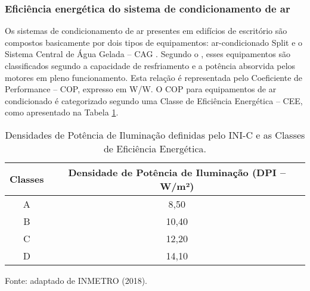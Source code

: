 \subsubsection{Eficiência energética do sistema de condicionamento de ar}
Os sistemas de condicionamento de ar presentes em edifícios de escritório são 
compostos basicamente por dois tipos de equipamentos: ar-condicionado Split e o 
Sistema Central de Água Gelada – CAG \cite{ConselhoBrasileirodeConstrucaoSustentavel-CBCS2015}.\vspace*{0.3cm} \newline
Segundo o \textcite{InstitutoNacionaldeMetrologiaNormalizacaoeQualidadeIndustrial-INMETRO2018}, esses equipamentos são classificados segundo a 
capacidade de resfriamento e a potência absorvida pelos motores em pleno 
funcionamento. Esta relação é representada pelo Coeficiente de Performance – COP, 
expresso em W/W. O COP para equipamentos de ar condicionado é categorizado 
segundo uma Classe de Eficiência Energética – CEE, como apresentado na Tabela \ref{tab:tabela6}.\vspace*{0.3cm} \newline
\begin{table}[ht]\centering
    \caption{\small Densidades de Potência de Iluminação definidas pelo INI-C e as Classes de Eficiência Energética.}
    \vspace*{0.3cm}
    \label{tab:tabela6}
    \begin{tabular*}{\columnwidth}{@{\extracolsep{\fill}}cc}
        \hline
        \textbf{Classes}                & \textbf{Densidade de Potência de Iluminação (DPI – W/m²)}\\ \hline
        A                               & 8,50                                                     \\ \hline
        B                               & 10,40                                                    \\ \hline
        C                               & 12,20                                                    \\ \hline
        D                               & 14,10                                                    \\ \hline
    \end{tabular*}
    \begin{flushleft}
        \par \small Fonte: adaptado de INMETRO (2018).
    \end{flushleft}
\end{table}

